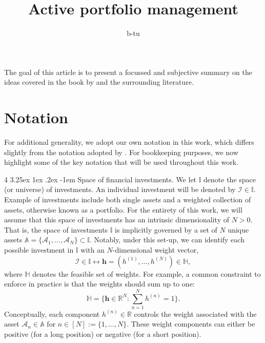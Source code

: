 \documentclass[12pt]{article}
\title{Active portfolio management}
\author{
	b-tu
}
\makeatletter
\renewcommand\paragraph{%
	\@startsection{paragraph}
	{4}
	{\z@}
	{3.25ex \@plus1ex \@minus.2ex}
	{-1em}
	{\normalfont\normalsize\bfseries\maybe@addperiod}%
}
\newcommand{\maybe@addperiod}[1]{%
	#1\@addpunct{.}%
}
\makeatother
\begin{document}
\maketitle
The goal of this article is to present a focussed and subjective summary on the ideas covered in the book by \cite{grinold1999} and the surrounding literature.
\section{Notation}
For additional generality, we adopt our own notation in this work, which differs slightly from the notation adopted by \cite{grinold1999}. For bookkeeping purposes, we now highlight some of the key notation that will be used throughout this work.

\paragraph{Space of financial investments.} We let $\mathbb{I}$ denote the space (or universe) of investments. An individual investment will be denoted by $\mathcal{I} \in \mathbb{I}$. Example of investments include both single assets and a weighted collection of assets, otherwise known as a portfolio. For the entirety of this work, we will assume that this space of investments has an intrinsic dimensionality of $N > 0$. That is, the space of investments $\mathbb{I}$ is implicitly governed by a set of $N$ unique assets $\mathbb{A} = \{\mathcal{A}_1, \dots, \mathcal{A}_N\} \subset \mathbb{I}$. Notably, under this set-up, we can identify each possible investment in $\mathbb{I}$ with an $N$-dimensional weight vector, 
\begin{equation}
	\mathcal{I} \in \mathbb{I} \longleftrightarrow \mathbf{h} = (h^{(1)}, \dots, h^{(N)}) \in \mathbb{H},
\end{equation}
where $\mathbb{H}$ denotes the feasible set of weights. For example, a common constraint to enforce in practice is that the weights should sum up to one:
\begin{equation}
	\mathbb{H} = \bigg\{\mathbf{h} \in \mathbb{R}^N: \sum_{n=1}^N h^{(n)} = 1 \bigg\}.
\end{equation}
Conceptually, each component $h^{(n)} \in \mathbb{R}$ controls the weight associated with the asset $\mathcal{A}_n \in \mathbb{A}$ for $n \in [N] := \{1,\dots,N\}$. These weight components can either be positive (for a long position) or negative (for a short position). 
\end{document}
